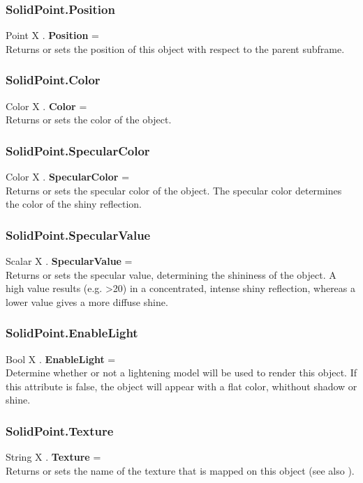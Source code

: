 \subsubsection{SolidPoint.Position \label{F:SolidPoint:Position}}
Point X . \textbf{Position} = \\
Returns or sets the position of this object with respect to the parent subframe.

\subsubsection{SolidPoint.Color \label{F:SolidPoint:Color}}
Color X . \textbf{Color} = \\
Returns or sets the color of the object.

\subsubsection{SolidPoint.SpecularColor \label{F:SolidPoint:SpecularColor}}
Color X . \textbf{SpecularColor} = \\
Returns or sets the specular color of the object. The specular color determines the color of the shiny reflection.

\subsubsection{SolidPoint.SpecularValue \label{F:SolidPoint:SpecularValue}}
Scalar X . \textbf{SpecularValue} = \\
Returns or sets the specular value, determining the shininess of the object. A high value results (e.g. >20) in a concentrated, intense shiny reflection, whereas a lower value gives a more diffuse shine.

\subsubsection{SolidPoint.EnableLight \label{F:SolidPoint:EnableLight}}
Bool X . \textbf{EnableLight} = \\
Determine whether or not a lightening model will be used to render this object. If this attribute is false, the object will appear with a flat color, whithout shadow or shine.

\subsubsection{SolidPoint.Texture \label{F:SolidPoint:Texture}}
String X . \textbf{Texture} = \\
Returns or sets the name of the texture that is mapped on this object (see also ).

